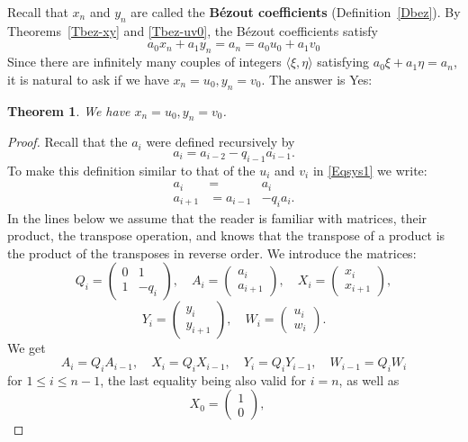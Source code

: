 \documentclass[12pt,letterpaper]{article}
\newtheorem{thm}{Theorem}%
\theoremstyle{definition}
\begin{document}
Recall that $x_n$ and $y_n$ are called the \textbf{Bézout coefficients} (Definition~\ref{Dbez}). By Theorems~\ref{Tbez-xy} and \ref{Tbez-uv0}, the Bézout coefficients satisfy 
$$
a_0 x_n + a_1 y_n = a_n = a_0 u_0 + a_1 v_0
$$ 
Since there are infinitely many couples of integers $\langle\xi,\eta\rangle$ satisfying $a_0 \xi + a_1 \eta = a_n$, it is natural to ask if we have $x_n=u_0, y_n=v_0$. The answer is Yes: 

\begin{thm}\label{Txyuv} 
We have $x_n=u_0, y_n=v_0$.  
\end{thm} 

\begin{proof}[Proof] 
Recall that the $a_i$ were defined recursively by 
$$
a_i=a_{i-2}-q_{i-1} a_{i-1}.
$$ 
To make this definition similar to that of the $u_i$ and $v_i$ in \eqref{Eqsys1} we write: 
\begin{equation}\label{Eqsys2}
\begin{aligned}
a_i &=   & a_i \\
a_{i+1} &= a_{i-1} & -q_i a_i.
\end{aligned}
\end{equation} 
In the lines below we assume that the reader is familiar with matrices, their product, the transpose operation, and knows that the transpose of a product is the product of the transposes in reverse order. We introduce the matrices: 
$$
Q_i=\begin{pmatrix} 0 & 1 \\ 1 & -q_i \end{pmatrix},\quad 
A_i=\begin{pmatrix} a_i \\ a_{i+1} \end{pmatrix}, \quad X_i=\begin{pmatrix} x_i \\ x_{i+1} \end{pmatrix},
$$ 
$$
Y_i=\begin{pmatrix} y_i \\ y_{i+1} \end{pmatrix},\quad 
W_i=\begin{pmatrix} u_i \\ w_i \end{pmatrix}.
$$ 
We get 
$$
A_i=Q_iA_{i-1},\quad X_i=Q_iX_{i-1},\quad Y_i=Q_iY_{i-1},\quad W_{i-1}=Q_iW_i
$$ 
for $1\le i\le n-1$, the last equality being also valid for $i=n$, as well as 
$$
X_0=\begin{pmatrix} 1 \\ 0 \end{pmatrix}, \quad 
$$
\end{proof}
\end{document}
